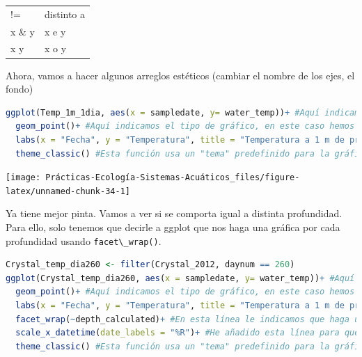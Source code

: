 \documentclass[
]{book}
\newcommand{\passthrough}[1]{#1}
\begin{document}
\begin{longtable}[]{@{}ll@{}}
\begin{minipage}[t]{0.14\columnwidth}
!=\strut
\end{minipage} & \begin{minipage}[t]{0.31\columnwidth}\raggedright
distinto a\strut
\end{minipage}\tabularnewline
\begin{minipage}[t]{0.14\columnwidth}\raggedright
x \& y\strut
\end{minipage} & \begin{minipage}[t]{0.31\columnwidth}\raggedright
x e y\strut
\end{minipage}\tabularnewline
\begin{minipage}[t]{0.14\columnwidth}\raggedright
x \textbar{} y\strut
\end{minipage} & \begin{minipage}[t]{0.31\columnwidth}\raggedright
x o y\strut
\end{minipage}\tabularnewline
\bottomrule
\end{longtable}

Ahora, vamos a hacer algunos arreglos estéticos (cambiar el nombre de los ejes, el fondo)

\begin{lstlisting}[language=R]
ggplot(Temp_1m_1dia, aes(x = sampledate, y= water_temp))+ #Aquí indicamos donde está la información que queremos representar (Crystal_2012) y qué variables x e y
  geom_point()+ #Aquí indicamos el tipo de gráfico, en este caso hemos elegido puntos
  labs(x = "Fecha", y = "Temperatura", title = "Temperatura a 1 m de profundidad")+ #Aquí  podemos modificar las etiquetas del gráfico.
  theme_classic() #Esta función usa un "tema" predefinido para la gráfica
\end{lstlisting}

\texttt{[image: Prácticas-Ecología-Sistemas-Acuáticos\_files/figure-latex/unnamed-chunk-34-1]}

Ya tiene mejor pinta. Vamos a ver si se comporta igual a distinta profundidad. Para ello, solo tenemos que decirle a ggplot que nos haga una gráfica por cada profundidad usando \passthrough{\lstinline!facet\_wrap()!}.

\begin{lstlisting}[language=R]
Crystal_temp_dia260 <- filter(Crystal_2012, daynum == 260)
ggplot(Crystal_temp_dia260, aes(x = sampledate, y= water_temp))+ #Aquí indicamos donde está la información que queremos representar (Crystal_2012) y que variables x e y
  geom_point()+ #Aquí indicamos el tipo de gráfico, en este caso hemos elegido puntos
  labs(x = "Fecha", y = "Temperatura", title = "Temperatura a 1 m de profundidad")+ #Aquí  podemos modificar las etiquetas del gráfico.
  facet_wrap(~depth_calculated)+ #En esta línea le indicamos que haga una gráfica por cada profundidad.
  scale_x_datetime(date_labels = "%R")+ #He añadido esta línea para que el formato de la fecha ponga solo la hora.
  theme_classic() #Esta función usa un "tema" predefinido para la gráfica
\end{lstlisting}
\end{document}
